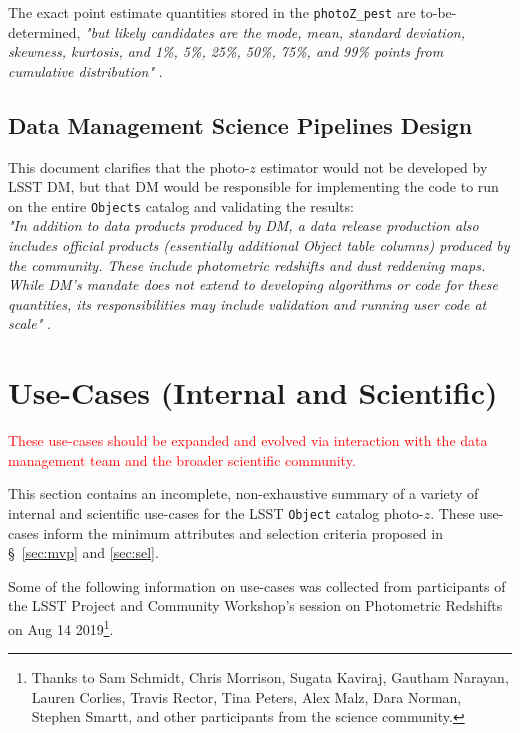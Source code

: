 \documentclass[DM,lsstdraft,toc]{lsstdoc}
\begin{document}
The exact point estimate quantities stored in the \texttt{photoZ\_pest} are to-be-determined, {\it "but likely candidates are the mode, mean, standard deviation, skewness, kurtosis, and 1\%, 5\%, 25\%, 50\%, 75\%, and 99\% points from cumulative distribution"} . 

\subsection{Data Management Science Pipelines Design}\label{ssec:docs_ldm151}

This document clarifies that the photo-$z$ estimator would not be developed by LSST DM, but that DM would be responsible for implementing the code to run on the entire {\tt Objects} catalog and validating the results: \\
{\it "In addition to data products produced by DM, a data release production also includes official
products (essentially additional Object table columns) produced by the community. These
include photometric redshifts and dust reddening maps. While DM's mandate does not extend
to developing algorithms or code for these quantities, its responsibilities may include validation
and running user code at scale"} .


\clearpage
\section{Use-Cases (Internal and Scientific)} \label{sec:use}

\textcolor{red}{These use-cases should be expanded and evolved via interaction with the data management team and the broader scientific community.}

This section contains an incomplete, non-exhaustive summary of a variety of internal and scientific use-cases for the LSST {\tt Object} catalog photo-$z$.
These use-cases inform the minimum attributes and selection criteria proposed in \S~\ref{sec:mvp} and \ref{sec:sel}. 

Some of the following information on use-cases was collected from participants of the LSST Project and Community Workshop's session on Photometric Redshifts on Aug 14 2019\footnote{Thanks to Sam Schmidt, Chris Morrison, Sugata Kaviraj, Gautham Narayan, Lauren Corlies, Travis Rector, Tina Peters, Alex Malz, Dara Norman, Stephen Smartt, and other participants from the science community.}.
\end{document}
